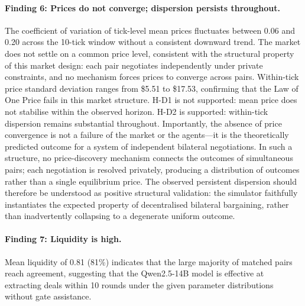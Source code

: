 \paragraph{Finding 6: Prices do not converge; dispersion persists throughout.}
The coefficient of variation of tick-level mean prices fluctuates between 0.06 and 0.20 across the 10-tick window without a consistent downward trend.  The market does not settle on a common price level, consistent with the structural property of this market design: each pair negotiates independently under private constraints, and no mechanism forces prices to converge across pairs.  Within-tick price standard deviation ranges from \$5.51 to \$17.53, confirming that the Law of One Price fails in this market structure.  H-D1 is not supported: mean price does not stabilise within the observed horizon.  H-D2 is supported: within-tick dispersion remains substantial throughout.  Importantly, the absence of price convergence is not a failure of the market or the agents---it is the theoretically predicted outcome for a system of independent bilateral negotiations.  In such a structure, no price-discovery mechanism connects the outcomes of simultaneous pairs; each negotiation is resolved privately, producing a distribution of outcomes rather than a single equilibrium price.  The observed persistent dispersion should therefore be understood as positive structural validation: the simulator faithfully instantiates the expected property of decentralised bilateral bargaining, rather than inadvertently collapsing to a degenerate uniform outcome.

\paragraph{Finding 7: Liquidity is high.}
Mean liquidity of 0.81 (81\%) indicates that the large majority of matched pairs reach agreement, suggesting that the Qwen2.5-14B model is effective at extracting deals within 10 rounds under the given parameter distributions without gate assistance.

